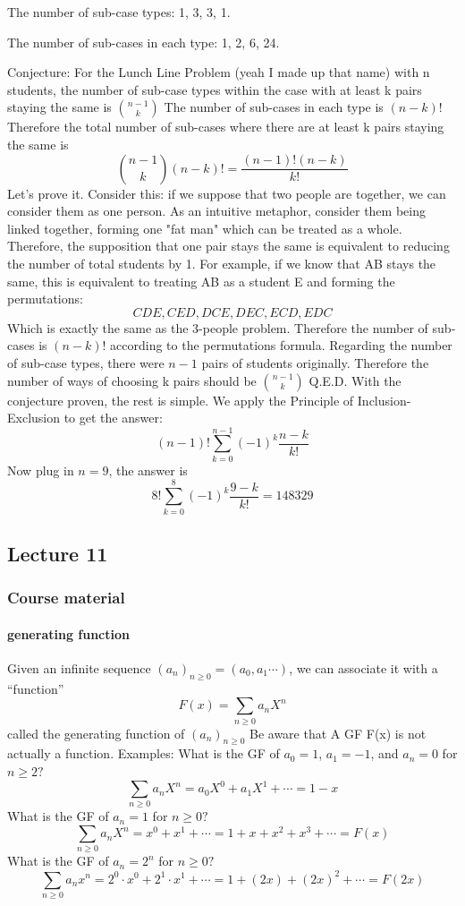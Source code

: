 \documentclass{article}
\begin{document}
The number of sub-case types: 1, 3, 3, 1.

The number of sub-cases in each type: 1, 2, 6, 24.

Conjecture: For the Lunch Line Problem (yeah I made up that name) with n students, the number of sub-case types within the case with at least k pairs staying the same is $\binom{n-1}{k}$ The number of sub-cases in each type is $(n-k)!$ Therefore the total number of sub-cases where there are at least k pairs staying the same is $$\binom{n-1}{k}(n-k)!=\frac{(n-1)!(n-k)}{k!}$$
Let's prove it. 
\newline
Consider this: if we suppose that two people are together, we can consider them as one person. As an intuitive metaphor, consider them being linked together, forming one "fat man" which can be treated as a whole.
\newline
Therefore, the supposition that one pair stays the same is equivalent to reducing the number of total students by 1. For example, if we know that AB stays the same, this is equivalent to treating AB as a student E and forming the permutations:\newline
$$CDE, CED, DCE, DEC, ECD, EDC$$
Which is exactly the same as the 3-people problem.\newline
Therefore the number of sub-cases is $(n-k)!$ according to the permutations formula.\newline
Regarding the number of sub-case types, there were $n-1$ pairs of students originally. Therefore the number of ways of choosing k pairs should be $\binom{n-1}{k}$\newline
Q.E.D.\newline
With the conjecture proven, the rest is simple. We apply the Principle of Inclusion-Exclusion to get the answer:$$(n-1)!\sum_{k=0}^{n-1}(-1)^k\frac{n-k}{k!}$$
Now plug in $n=9$, the answer is
$$8!\sum_{k=0}^{8}(-1)^k\frac{9-k}{k!}=148329$$
\subsection{Lecture 11}
\subsubsection{Course material}
\paragraph{generating function}
Given an infinite sequence $(a_n)_{n\ge 0}=(a_0,a_1 \cdots)$, we can associate it with a “function”$$
F(x)=\sum_{n\ge 0}a_n X^n$$
called the generating function of $(a_n)_{n\ge 0}$
Be aware that A GF F(x) is not actually a function.\newline
Examples:\newline
What is the GF of $a_0 = 1$, $a_1 = -1$, and $a_n = 0$ for $n\ge 2?$
$$\sum_{n\ge 0}a_n X^n =a_0 X^0+a_1 X^1+\cdots=1-x$$
What is the GF of $a_n = 1$ for $n\ge 0?$
$$\sum_{n\ge 0}a_n X^n =x^0+x^1+\cdots=1+x+x^2+x^3+\cdots =F(x)$$
What is the GF of $a_n = 2^n$ for $n\ge 0?$
$$\sum_{n\ge 0}a_nx^n=2^0\cdot x^0 +2^1\cdot x^1 +\cdots =1+(2x)+(2x)^2+\cdots =F(2x)$$
\end{document}
